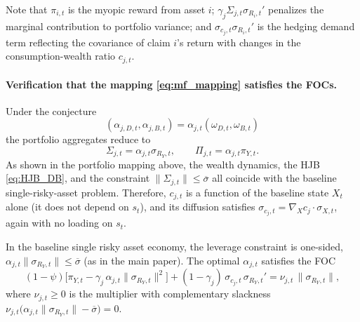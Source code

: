 \documentclass[11pt,english]{article}
\begin{document}
Note that $\pi_{i,t}$ is the myopic reward from asset $i$; $\gamma_j\Sigma_{j,t}\sigma_{R_i,t}'$ penalizes the marginal contribution to portfolio variance; and $\sigma_{c_j,t}\sigma_{R_i,t}'$ is the hedging demand term reflecting the covariance of claim $i$'s return with changes in the consumption-wealth ratio $c_{j,t}$.

\paragraph{Verification that the mapping \eqref{eq:mf_mapping} satisfies the FOCs.}
Under the conjecture $$(\alpha_{j,D,t},\alpha_{j,B,t})=\alpha_{j,t}(\omega_{D,t},\omega_{B,t})$$
 the portfolio aggregates reduce to
\begin{equation}\label{eq:Sigma_Pi_under_conjecture}
    \Sigma_{j,t}=\alpha_{j,t}\sigma_{R_Y,t},
    \qquad
    \Pi_{j,t}=\alpha_{j,t}\pi_{Y,t}.
\end{equation}
As shown in the portfolio mapping above, the wealth dynamics, the HJB \eqref{eq:HJB_DB}, and the constraint $\|\Sigma_{j,t}\|\le\overline{\sigma}$ all coincide with the baseline single-risky-asset problem. Therefore, $c_{j,t}$ is a function of the baseline state $X_t$ alone (it does not depend on $s_t$), and its diffusion satisfies $\sigma_{c_j,t}=\nabla_{\!X}c_j\cdot\sigma_{X,t}$, again with no loading on $s_t$.

In the baseline single risky asset economy, the leverage constraint is one-sided, $\alpha_{j,t}\|\sigma_{R_Y,t}\|\le\overline{\sigma}$ (as in the main paper). The optimal $\alpha_{j,t}$ satisfies the FOC
\begin{equation}\label{eq:FOC_baseline}
    (1-\psi)\Big[\pi_{Y,t}-\gamma_j\,\alpha_{j,t}\|\sigma_{R_Y,t}\|^2\Big]
    + (1-\gamma_j)\,\sigma_{c_j,t}\,\sigma_{R_Y,t}'
    = \nu_{j,t}\,\|\sigma_{R_Y,t}\|,
\end{equation}
where $\nu_{j,t}\ge 0$ is the multiplier with complementary slackness $\nu_{j,t}\big(\alpha_{j,t}\|\sigma_{R_Y,t}\|-\overline{\sigma}\big)=0$.
\end{document}
